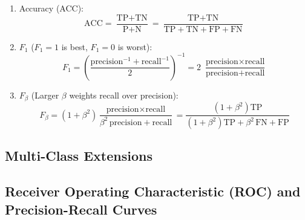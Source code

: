 \begin{enumerate}[noitemsep]
  \item Accuracy (ACC):
\begin{equation} \label{eq:ACC}
\text{ACC} = \frac{\text{TP}+\text{TN}}{\text{P}+\text{N}} = \frac{\text{TP}+\text{TN}}{\text{TP}+\text{TN}+\text{FP}+\text{FN}}
\end{equation}

  \item $F_{1}$ ($F_{1}=1$ is best, $F_{1}=0$ is worst):
\begin{equation} \label{eq:F1}
F_{1} = \left(\frac{\text{precision}^{-1}+\text{recall}^{-1}}{2}\right)^{-1} = 2\,\,\frac{\text{precision} \times \text{recall}}{\text{precision} + \text{recall}}
\end{equation}

  \item $F_{\beta}$ (Larger $\beta$ weights recall over precision):
\begin{equation} \label{eq:Fbeta}
F_{\beta} = \left(1+\beta^{2}\right) \frac{\text{precision} \times \text{recall}}{\beta^{2}\,\text{precision} + \text{recall}} =
\frac{\left(1+\beta^{2}\right) \text{TP}}{\left(1+\beta^{2}\right) \text{TP} + \beta^{2}\,\text{FN} + \text{FP}}
\end{equation}
\end{enumerate}

\subsection{Multi-Class Extensions}
\label{ml_general:eval:multi_class}

\subsection{Receiver Operating Characteristic (ROC) and Precision-Recall Curves}
\label{ml_general:eval:ROC}


